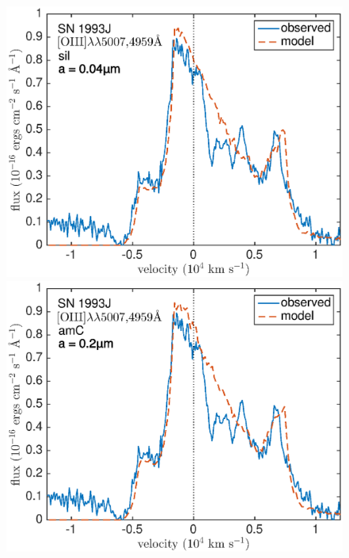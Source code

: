 \begin{figure}
\centering
\includegraphics[scale=0.4,clip=true, trim=0 0 40 20]{chapters/chapter6/figs/93J/clumped/OIII_sil} \hspace{0.5mm}
\includegraphics[scale=0.4,clip=true, trim=40 0 40 20]{chapters/chapter6/figs/93J/clumped/OIII_amC}


\end{figure}
